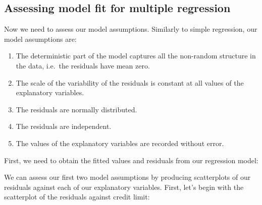 \documentclass[
  letterpaper,
  DIV=11,
  numbers=noendperiod]{scrartcl}
\newenvironment{Shaded}{\begin{snugshade}}{\end{snugshade}}
\newcommand{\AttributeTok}[1]{\textcolor[rgb]{0.40,0.45,0.13}{#1}}
\newcommand{\DecValTok}[1]{\textcolor[rgb]{0.68,0.00,0.00}{#1}}
\newcommand{\FunctionTok}[1]{\textcolor[rgb]{0.28,0.35,0.67}{#1}}
\newcommand{\NormalTok}[1]{\textcolor[rgb]{0.00,0.23,0.31}{#1}}
\newcommand{\OtherTok}[1]{\textcolor[rgb]{0.00,0.23,0.31}{#1}}
\newcommand{\SpecialCharTok}[1]{\textcolor[rgb]{0.37,0.37,0.37}{#1}}
\newcommand{\StringTok}[1]{\textcolor[rgb]{0.13,0.47,0.30}{#1}}
\providecommand{\tightlist}{%
  \setlength{\itemsep}{0pt}\setlength{\parskip}{0pt}}\usepackage{longtable,booktabs,array}
\begin{document}
\subsection{Assessing model fit for multiple
regression}\label{assessing-model-fit-for-multiple-regression}

Now we need to assess our model assumptions. Similarly to simple
regression, our model assumptions are:

\begin{enumerate}
\def\labelenumi{\arabic{enumi}.}
\tightlist
\item
  The deterministic part of the model captures all the non-random
  structure in the data, i.e.~the residuals have mean zero.
\item
  The scale of the variability of the residuals is constant at all
  values of the explanatory variables.
\item
  The residuals are normally distributed.
\item
  The residuals are independent.
\item
  The values of the explanatory variables are recorded without error.
\end{enumerate}

First, we need to obtain the fitted values and residuals from our
regression model:

\begin{Shaded}
\end{Shaded}

We can assess our first two model assumptions by producing scatterplots
of our residuals against each of our explanatory variables. First, let's
begin with the scatterplot of the residuals against credit limit:

\begin{Shaded}
\end{Shaded}
\end{document}
